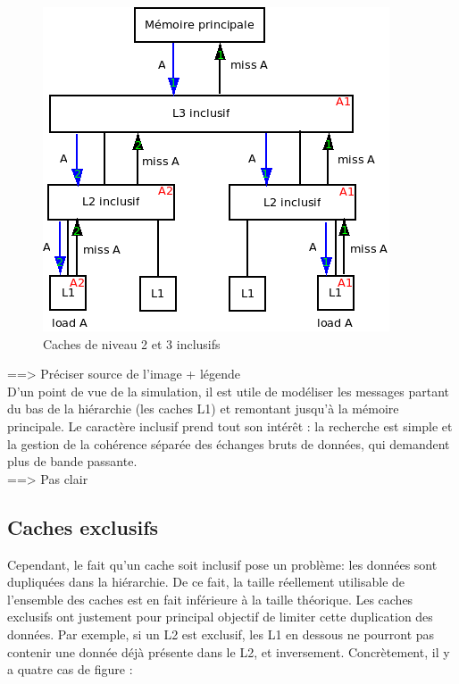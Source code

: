 \begin{figure}[!h]
\begin{center}
   \includegraphics[scale=0.7]{inclusifs.png}
   \caption{\label{img:inclusifs} Caches de niveau 2 et 3 inclusifs}
\end{center}
\end{figure}

==> Préciser source de l'image + légende\\

D'un point de vue de la simulation, il est utile de modéliser les messages partant du bas de la hiérarchie (les caches L1) et remontant jusqu'à la mémoire principale. Le caractère inclusif prend tout son intérêt : la recherche est simple et la gestion de la cohérence séparée des échanges bruts de données, qui demandent plus de bande passante.\\

==> Pas clair

\subsection{Caches exclusifs}
Cependant, le fait qu'un cache soit inclusif pose un problème: les données sont dupliquées dans la hiérarchie. De ce fait, la taille réellement utilisable de l'ensemble des caches est en fait inférieure à la taille théorique. Les caches exclusifs ont justement pour principal objectif de limiter cette duplication des données. Par exemple, si un L2 est exclusif, les L1 en dessous ne pourront pas contenir une donnée déjà présente dans le L2, et inversement. Concrètement, il y a quatre cas de figure : \\

